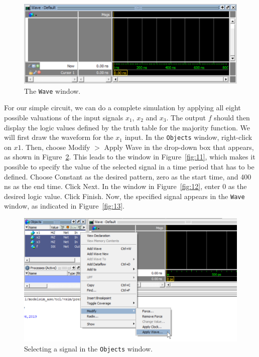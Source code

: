 \documentclass[11pt, twoside, pdftex]{article}
\begin{document}
\begin{figure}[H]
   \begin{center}
      \includegraphics[scale=1.0]{figures/figure9.png}
       \caption{The \texttt{Wave} window.} 
	 \label{fig:9}
	 \end{center}
\end{figure}

For our simple circuit, we can do a complete simulation by applying all eight possible 
valuations of the input signals $x_1$, $x_2$ and $x_3$. The output $f$ should then display 
the logic values defined by the truth table for the majority function. We will first draw 
the waveform for the $x_1$ input.  In the \texttt{Objects} window, right-click on $x1$. Then, 
choose {\sf Modify $>$ Apply Wave} in the drop-down box that appears, as shown in 
Figure~\ref{fig:10}. This leads to the window in Figure~\ref{fig:11}, which makes it possible 
to specify the value of the selected signal in a time period that has to be defined. 
Choose {\sf Constant} as the desired pattern, zero as the start time, and 400 ns as 
the end time. Click {\sf Next}. In the window in Figure~\ref{fig:12}, enter 0 as the 
desired logic value. Click {\sf Finish}.  Now, the specified signal appears in the \texttt{Wave} 
window, as indicated in Figure~\ref{fig:13}.

\begin{figure}[H]
   \begin{center}
      \includegraphics[scale=1.0]{figures/figure10.png}
       \caption{Selecting a signal in the \texttt{Objects} window.} 
	 \label{fig:10}
	 \end{center}
\end{figure}
\end{document}
